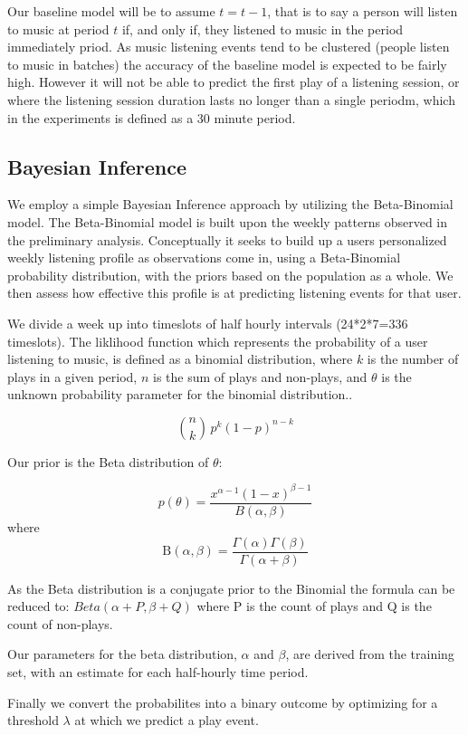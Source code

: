 Our baseline model will be to assume $t = t-1$, that is to say a person will listen to music at period $t$ if, and only if, they listened to music in the period immediately priod. As music listening events tend to be clustered (people listen to music in batches) the accuracy of the baseline model is expected to be fairly high. However it will not be able to predict the first play of a listening session, or where the listening session duration lasts no longer than a single periodm, which in the experiments is defined as a 30 minute period.

\subsection{Bayesian Inference}

We employ a simple Bayesian Inference approach by utilizing the Beta-Binomial model. The Beta-Binomial model is built upon the weekly patterns observed in the preliminary analysis. Conceptually it seeks to build up a users personalized weekly listening profile as observations come in, using a Beta-Binomial probability distribution, with the priors based on the population as a whole. We then assess how effective this profile is at predicting listening events for that user.

We divide a week up into timeslots of half hourly intervals (24*2*7=336 timeslots). The liklihood function which represents the probability of a user listening to music, is defined as a binomial distribution, where $k$ is the number of plays in a given period, $n$ is the sum of plays and non-plays, and $\theta$ is the unknown probability parameter for the binomial distribution.. 

$${n \choose k}\,p^{k}(1-p)^{n-k}$$

Our prior is the Beta distribution of $\theta$:

$$p(\theta)=\frac{x^{\alpha-1}(1-x)^{\beta-1}} {B(\alpha,\beta)}$$ where
$$\mathrm {B} (\alpha ,\beta )={\frac {\Gamma (\alpha )\Gamma (\beta )}{\Gamma (\alpha +\beta )}}$$

As the Beta distribution is a conjugate prior to the Binomial the formula can be reduced to: $Beta(\alpha+P, \beta+Q)$ where P is the count of plays and Q is the count of non-plays.

Our parameters for the beta distribution, $\alpha$ and $\beta$, are derived from the training set, with an estimate for each half-hourly time period. 

Finally we convert the probabilites into a binary outcome by optimizing for a threshold $\lambda$ at which we predict a play event.

